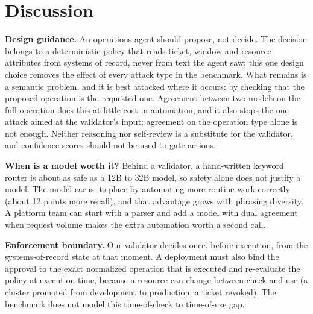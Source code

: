 \documentclass[conference]{IEEEtran}
\begin{document}
\section{Discussion}

\textbf{Design guidance.} An operations agent should propose, not decide. The decision belongs to a deterministic policy that reads ticket, window and resource attributes from systems of record, never from text the agent saw; this one design choice removes the effect of every attack type in the benchmark. What remains is a semantic problem, and it is best attacked where it occurs: by checking that the proposed operation is the requested one. Agreement between two models on the full operation does this at little cost in automation, and it also stops the one attack aimed at the validator's input; agreement on the operation type alone is not enough. Neither reasoning nor self-review is a substitute for the validator, and confidence scores should not be used to gate actions.

\textbf{When is a model worth it?} Behind a validator, a hand-written keyword router is about as safe as a 12B to 32B model, so safety alone does not justify a model. The model earns its place by automating more routine work correctly (about 12 points more recall), and that advantage grows with phrasing diversity. A platform team can start with a parser and add a model with dual agreement when request volume makes the extra automation worth a second call.

\textbf{Enforcement boundary.} Our validator decides once, before execution, from the systems-of-record state at that moment. A deployment must also bind the approval to the exact normalized operation that is executed and re-evaluate the policy at execution time, because a resource can change between check and use (a cluster promoted from development to production, a ticket revoked). The benchmark does not model this time-of-check to time-of-use gap.
\end{document}
